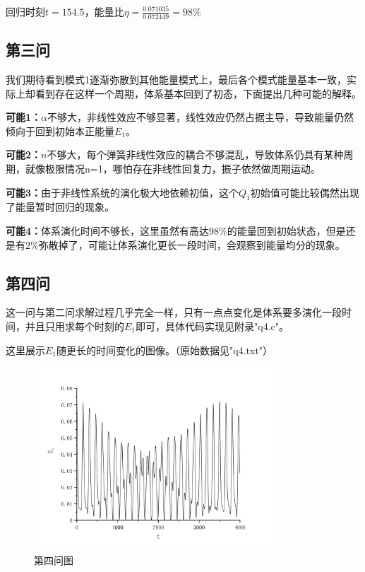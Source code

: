 \documentclass[10pt, a4paper]{article}
\begin{document}
    回归时刻$t=154.5$，能量比$\eta=\frac{0.071035}{0.072449}=98\%$

    \subsection{第三问}

    我们期待看到模式1逐渐弥散到其他能量模式上，最后各个模式能量基本一致，实际上却看到存在这样一个周期，体系基本回到了初态，下面提出几种可能的解释。

    \textbf{可能1：}$\alpha$不够大，非线性效应不够显著，线性效应仍然占据主导，导致能量仍然倾向于回到初始本正能量$E_1$。

    \textbf{可能2：}$n$不够大，每个弹簧非线性效应的耦合不够混乱，导致体系仍具有某种周期，就像极限情况n=1，哪怕存在非线性回复力，振子依然做周期运动。

    \textbf{可能3：}由于非线性系统的演化极大地依赖初值，这个$Q_1$初始值可能比较偶然出现了能量暂时回归的现象。

    \textbf{可能4：}体系演化时间不够长，这里虽然有高达$98\%$的能量回到初始状态，但是还是有$2\%$弥散掉了，可能让体系演化更长一段时间，会观察到能量均分的现象。

    \subsection{第四问}

    这一问与第二问求解过程几乎完全一样，只有一点点变化是体系要多演化一段时间，并且只用求每个时刻的$E_1$即可，具体代码实现见附录"q4.c"。

    这里展示$E_1$随更长的时间变化的图像。（原始数据见"q4.txt"）

    \begin{figure}[H]
        \centering
        \includegraphics[width=0.8\textwidth]{第四问图.jpg}
        \caption{第四问图}\label{fig:第四问图}
    \end{figure}
\end{document}
